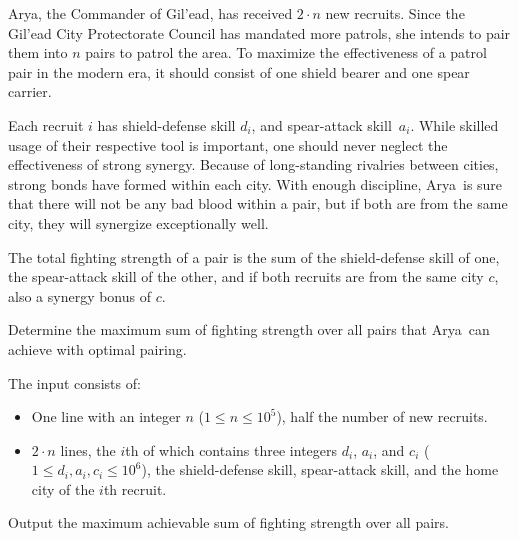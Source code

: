 

\newcommand{\maxn}{10^5}
\newcommand{\maxa}{10^6}
\newcommand{\name}{Arya}

\name, the Commander of Gil'ead, has received $2 \cdot n$ new recruits.
Since the Gil'ead City Protectorate Council has mandated more patrols,
she intends to pair them into $n$ pairs to patrol the area.
To maximize the effectiveness of a patrol pair in the modern era, it should consist of one shield bearer and one spear carrier.

Each recruit $i$ has shield-defense skill $d_i$, and spear-attack skill~$a_i$.
While skilled usage of their respective tool is important, one should never neglect the effectiveness of strong synergy.
Because of long-standing rivalries between cities, strong bonds have formed within each city.
With enough discipline, \name\ is sure that there will not be any bad blood within a pair,
but if both are from the same city, they will synergize exceptionally well.

The total fighting strength of a pair is the sum of the shield-defense skill of one,
the spear-attack skill of the other, and if both recruits are from the same city $c$, also a synergy bonus of $c$.

Determine the maximum sum of fighting strength over all pairs that \name\ can achieve with optimal pairing.

\begin{Input}
    The input consists of:
    \begin{itemize}
        \item One line with an integer $n$ ($1\leq n \leq \maxn$), half the number of new recruits.
        \item $2 \cdot n$ lines, the $i$th of which contains three integers $d_i$, $a_i$, and $c_i$ ($1 \leq d_i, a_i, c_i \leq \maxa$), the shield-defense skill, spear-attack skill, and the home city of the $i$th recruit.
    \end{itemize}
\end{Input}

\begin{Output}
    Output the maximum achievable sum of fighting strength over all pairs.
\end{Output}

